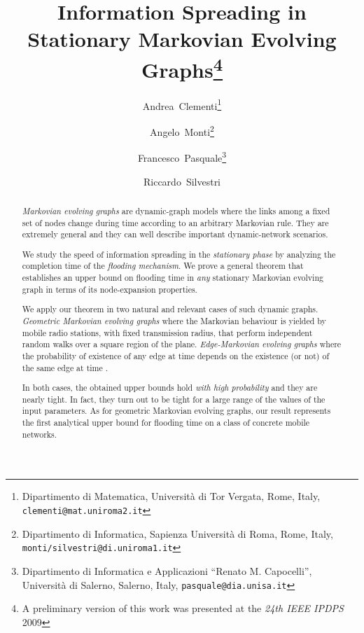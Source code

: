 \documentclass[10pt,a4paper]{article}
\begin{document}
\title{\bf{Information Spreading in \\ Stationary Markovian Evolving Graphs}\thanks{A preliminary version of this work was presented at the \emph{24th IEEE IPDPS} 2009}}
\author{Andrea~Clementi\thanks{Dipartimento di Matematica, Universit\`a di  Tor Vergata, Rome, Italy, \texttt{clementi@mat.uniroma2.it}}
\and
Angelo~Monti\thanks{Dipartimento di Informatica, Sapienza Universit\`a di Roma, Rome, Italy, \texttt{monti/silvestri@di.uniroma1.it}}
\and
Francesco~Pasquale\thanks{Dipartimento di Informatica e Applicazioni ``Renato M. Capocelli'', Universit\`a di Salerno, Salerno, Italy, \texttt{pasquale@dia.unisa.it}}
\and
Riccardo~Silvestri}
\date{}


\maketitle




\begin{abstract}
\emph{Markovian evolving graphs}  are dynamic-graph models where the links among a fixed set of nodes change during time according to an arbitrary Markovian rule. They are extremely general and they can well describe important dynamic-network scenarios.

We study the speed of information spreading in the \emph{stationary phase} by analyzing the completion time of the \emph{flooding mechanism}. We prove a general theorem that establishes an upper bound on flooding time in \emph{any} stationary Markovian evolving graph in terms of its node-expansion properties.

We apply our theorem in two natural and relevant cases of such dynamic graphs. \emph{Geometric Markovian evolving graphs}  where the Markovian behaviour is yielded by  mobile radio stations, with fixed transmission radius, that perform   independent random walks over a square region of the plane.  \emph{Edge-Markovian evolving graphs}  where the probability of existence of any edge at time  depends on the existence (or not) of the same edge at time .

In both cases, the obtained upper bounds hold \emph{with high probability} and they are nearly tight. In fact, they turn out to be tight for a large range of the values of the input parameters. As for geometric Markovian evolving graphs, our result represents the first analytical upper  bound for flooding time on a class of concrete mobile networks.

\end{abstract}
\end{document}
